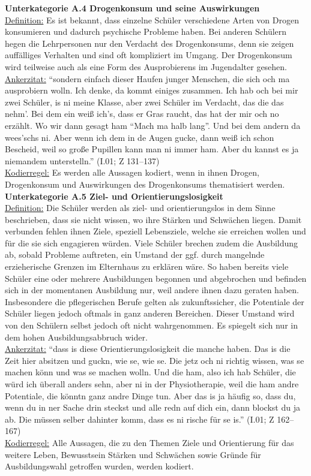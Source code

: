 \textbf{Unterkategorie A.4 Drogenkonsum und seine Auswirkungen}\\
\underline{Definition:} Es ist bekannt, dass einzelne Schüler verschiedene Arten von Drogen konsumieren und dadurch psychische Probleme haben. Bei anderen Schülern hegen die Lehrpersonen nur den Verdacht des Drogenkonsums, denn sie zeigen auffälliges Verhalten und sind oft kompliziert im Umgang. Der Drogenkonsum wird teilweise auch als eine Form des Ausprobierens im Jugendalter gesehen.\\
\underline{Ankerzitat:} "`sondern einfach dieser Haufen junger Menschen, die sich och ma ausprobiern wolln. Ich denke, da kommt einiges zusammen. Ich hab och bei mir zwei Schüler, is ni meine Klasse, aber zwei Schüler im Verdacht, das die das nehm'. Bei dem ein weiß ich's, dass er Gras raucht, das hat der mir och no erzählt. Wo wir dann gesagt ham "`Mach ma halb lang"'. Und bei dem andern da wees'schs ni. Aber wenn ich dem in de Augen gucke, dann weiß ich schon Bescheid, weil so große Pupillen kann man ni immer ham. Aber du kannst es ja niemandem unterstelln."' (I.01; Z 131--137)\\
\underline{Kodierregel:} Es werden alle Aussagen kodiert, wenn in ihnen Drogen, Drogenkonsum und Auswirkungen des Drogenkonsums thematisiert werden.\\

\textbf{Unterkategorie A.5 Ziel- und Orientierungslosigkeit}\\
\underline{Definition:} Die Schüler werden als ziel- und orientierungslos in dem Sinne beschrieben, dass sie nicht wissen, wo ihre Stärken und Schwächen liegen. Damit verbunden fehlen ihnen Ziele, speziell Lebensziele, welche sie erreichen wollen und für die sie sich engagieren würden. Viele Schüler brechen zudem die Ausbildung ab, sobald Probleme auftreten, ein Umstand der ggf. durch mangelnde erzieherische Grenzen im Elternhaus zu erklären wäre. So haben bereits viele Schüler eine oder mehrere Ausbildungen begonnen und abgebrochen und befinden sich in der momentanen Ausbildung nur, weil andere ihnen dazu geraten haben. Insbesondere die pflegerischen Berufe gelten als zukunftssicher, die Potentiale der Schüler liegen jedoch oftmals in ganz anderen Bereichen. Dieser Umstand wird von den Schülern selbst jedoch oft nicht wahrgenommen. Es spiegelt sich nur in dem hohen Ausbildungsabbruch wider.\\
\underline{Ankerzitat:} "`dass is diese Orientierungslosigkeit die manche haben. Das is die Zeit hier absitzen und guckn, wie se, wie se. Die jetz och ni richtig wissen, was se machen könn und was se machen wolln. Und die ham, also ich hab Schüler, die würd ich überall anders sehn, aber ni in der Physiotherapie, weil die ham andre Potentiale, die könntn ganz andre Dinge tun. Aber das is ja häufig so, dass du, wenn du in ner Sache drin steckst und alle redn auf dich ein, dann blockst du ja ab. Die müssen selber dahinter komm, dass es ni rische für se is."' (I.01; Z 162--167)\\
\underline{Kodierregel:} Alle Aussagen, die zu den Themen Ziele und Orientierung für das weitere Leben, Bewusstsein Stärken und Schwächen sowie Gründe für Ausbildungswahl getroffen wurden, werden kodiert. \\

